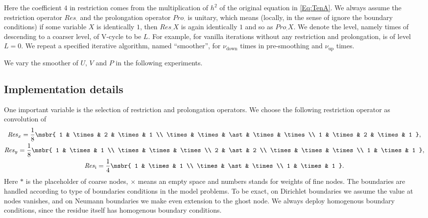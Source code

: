 \documentclass[english, nochinese]{pnote}
\begin{document}
Here the coefficient $4$ in restriction comes from the multiplication of $h^2$ of the original equation in \eqref{Eq:TenA}. We always assume the restriction operator $\mathit{Res}_{\cdot}$ and the prolongation operator $\mathit{Pro}_{\cdot}$ is unitary, which means (locally, in the sense of ignore the boundary conditions) if some variable $X$ is identically $1$, then $ \mathit{Res}_{\cdot} X $ is again identically $1$ and so as $ \mathit{Pro}_{\cdot} X $. We denote the level, namely times of descending to a coarser level, of V-cycle to be $L$. For example, for vanilla iterations without any restriction and prolongation, is of level $ L = 0 $. We repeat a specified iterative algorithm, named ``smoother'', for $\nu_{\text{down}}$ times in pre-smoothing and $\nu_{\text{up}}$ times.

We vary the smoother of $U$, $V$ and $P$ in the following experiments.

\subsection{Implementation details}

One important variable is the selection of restriction and prolongation operators. We choose the following restriction operator as convolution of
\begin{gather}
\mathit{Res}_x = \frac{1}{8} \msbr{ 1 & \times & 2 & \times & 1 \\ \times & \times & \ast & \times & \times \\ 1 & \times & 2 & \times & 1 }, \\
\mathit{Res}_y = \frac{1}{8} \msbr{ 1 & \times & 1 \\ \times & \times & \times \\ 2 & \ast & 2 \\ \times & \times & \times \\ 1 & \times & 1 }, \\
\mathit{Res}_{\text{i}} = \frac{1}{4} \msbr{ 1 & \times & 1 \\ \times & \ast & \times \\ 1 & \times & 1 }.
\end{gather}
Here $\ast$ is the placeholder of coarse nodes, $\times$ means an empty space and numbers stands for weights of fine nodes. The boundaries are handled according to type of boundaries conditions in the model problems. To be exact, on Dirichlet boundaries we assume the value at nodes vanishes, and on Neumann boundaries we make even extension to the ghost node. We always deploy homogenous boundary conditions, since the residue itself has homogenous boundary conditions.
\end{document}
